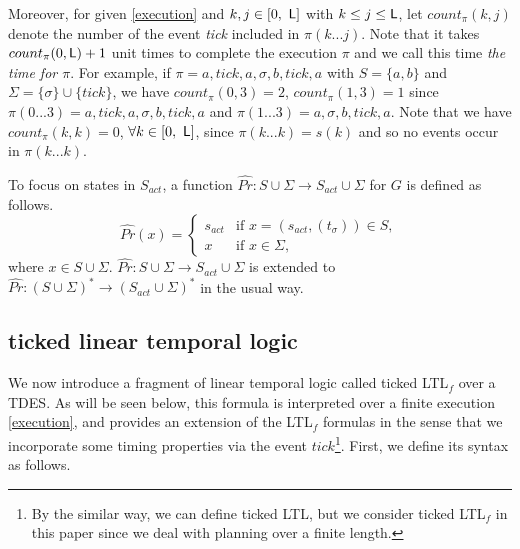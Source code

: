 \documentclass{article}
\newcommand{\req}[1]{\eqref{#1}}
\renewcommand{\Pr}{\widehat{Pr}}
\newcommand{\Len}{{\sf L}}
\begin{document}
Moreover, for given \req{execution} and $k, j\in [0,\ \Len]$ with $k \leq j \leq \Len$, let $count_\pi(k,j)$ denote the number of the event \textit{tick} included in $\pi(k...j)$.
Note that it takes $count_{\pi}(0, {\Len})+1$ unit times to complete the execution $\pi$ and we call this time \textit{the time for $\pi$}.
%
For example, if $\pi=a,\textit{tick},a,\sigma,b,\textit{tick},a$ with $S=\{a,b\}$ and $\Sigma = \{\sigma\}\cup \{\textit{tick}\}$, we have $count_\pi(0,3) = 2$, $count_\pi (1, 3) = 1$ since $\pi(0...3) = a,\textit{tick},a,\sigma,b,\textit{tick},a$ and $\pi(1...3) = a,\sigma,b,\textit{tick},a$. Note that we have $count_\pi(k, k)=0$, $\forall k \in [ 0, \ \Len ]$, since $\pi(k...k) = s(k)$ and so no events occur in $\pi(k...k)$.
%
%

To focus on states in $S_{act}$, a function $\Pr: S \cup \Sigma \to S_{act} \cup \Sigma $ for $G$ is defined as follows.
\label{def:Pr}
\[
\Pr (x )=\left\{
\begin{array}{ll}
s_{act} & \mbox{if }x =(s_{act}, (t_{\sigma})) \in S,  \\ 
x  & \mbox{if } x \in \Sigma , 
\end{array} \right.
\]
where $x  \in S  \cup \Sigma $. 
$\Pr : S \cup \Sigma \to S_{act} \cup \Sigma$ is extended to $\Pr : (S  \cup \Sigma )^* \to  (S_{act} \cup \Sigma )^*$ in the usual way.
%
%
\subsection{ticked linear temporal logic}
We now introduce a fragment of linear temporal logic called ticked LTL$_f$ over a TDES\cite{KHU2020}.
As will be seen below, this formula is interpreted over a finite execution \req{execution}, and provides an extension of the LTL$_f$ formulas\cite{Zhu2017} in the sense that we incorporate some timing properties via the event ${\textit{tick}}$\footnote{By the similar way, we can define ticked LTL, but we consider ticked LTL$_{f}$ in this paper since we deal with planning over a finite length.}.
First, we define its syntax as follows.
\end{document}
